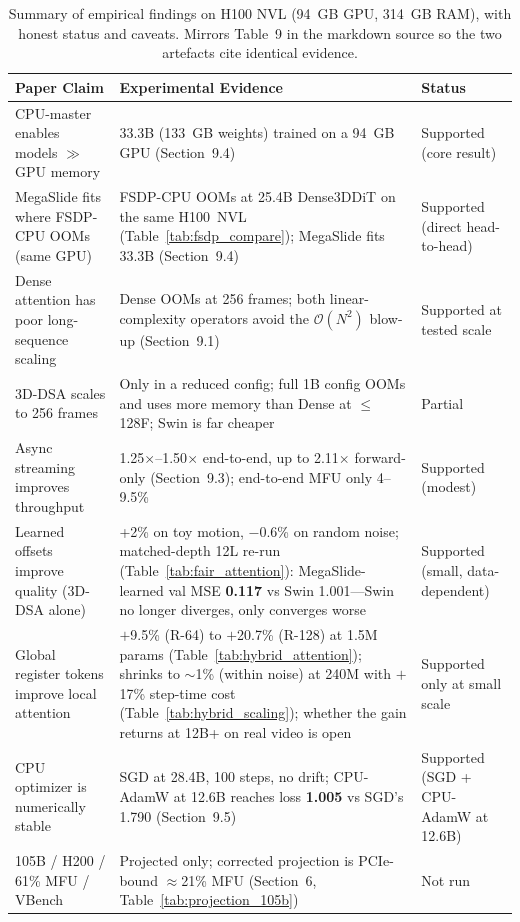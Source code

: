 \documentclass[11pt, letterpaper]{article}
\begin{document}
\begin{table}[h]
\centering
\begin{tabular}{p{4.3cm}p{6.5cm}p{3.5cm}}
\toprule
\textbf{Paper Claim} & \textbf{Experimental Evidence} & \textbf{Status} \\
\midrule
CPU-master enables models $\gg$ GPU memory & 33.3B (133~GB weights) trained on a 94~GB GPU (Section~9.4) & Supported (core result) \\
MegaSlide fits where FSDP-CPU OOMs (same GPU) & FSDP-CPU OOMs at 25.4B Dense3DDiT on the same H100~NVL (Table~\ref{tab:fsdp_compare}); MegaSlide fits 33.3B (Section~9.4) & Supported (direct head-to-head) \\
Dense attention has poor long-sequence scaling & Dense OOMs at 256 frames; both linear-complexity operators avoid the $\mathcal{O}(N^2)$ blow-up (Section~9.1) & Supported at tested scale \\
3D-DSA scales to 256 frames & Only in a reduced config; full 1B config OOMs and uses more memory than Dense at $\leq$128F; Swin is far cheaper & Partial \\
Async streaming improves throughput & 1.25$\times$--1.50$\times$ end-to-end, up to 2.11$\times$ forward-only (Section~9.3); end-to-end MFU only 4--9.5\% & Supported (modest) \\
Learned offsets improve quality (3D-DSA alone) & +2\% on toy motion, $-0.6$\% on random noise; matched-depth 12L re-run (Table~\ref{tab:fair_attention}): MegaSlide-learned val MSE \textbf{0.117} vs Swin 1.001---Swin no longer diverges, only converges worse & Supported (small, data-dependent) \\
Global register tokens improve local attention & $+$9.5\% (R-64) to $+$20.7\% (R-128) at 1.5M params (Table~\ref{tab:hybrid_attention}); shrinks to $\sim$1\% (within noise) at 240M with $+$17\% step-time cost (Table~\ref{tab:hybrid_scaling}); whether the gain returns at 12B+ on real video is open & Supported only at small scale \\
CPU optimizer is numerically stable & SGD at 28.4B, 100 steps, no drift; CPU-AdamW at 12.6B reaches loss \textbf{1.005} vs SGD's 1.790 (Section~9.5) & Supported (SGD + CPU-AdamW at 12.6B) \\
105B / H200 / 61\% MFU / VBench & Projected only; corrected projection is PCIe-bound $\approx$21\% MFU (Section~6, Table~\ref{tab:projection_105b}) & Not run \\
\bottomrule
\end{tabular}
\caption{Summary of empirical findings on H100 NVL (94~GB GPU, 314~GB RAM), with honest status and caveats. Mirrors Table~9 in the markdown source so the two artefacts cite identical evidence.}
\end{table}
\end{document}
